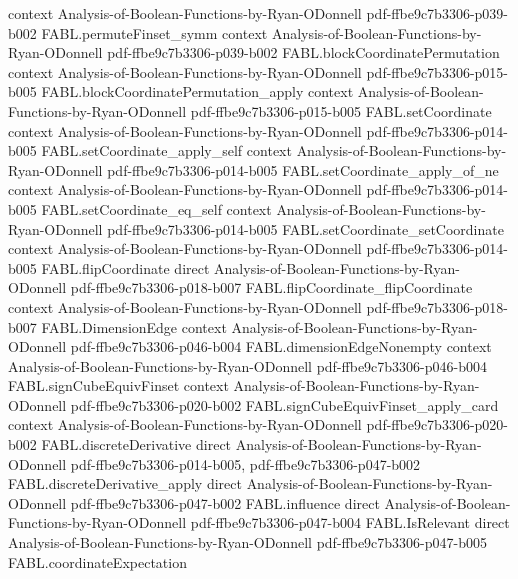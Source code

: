 \begin{theorem}
  {context}
  {Analysis-of-Boolean-Functions-by-Ryan-ODonnell}
  {pdf-ffbe9c7b3306-p039-b002}
\proofstep
  {FABL.permuteFinset_symm}
  {context}
  {Analysis-of-Boolean-Functions-by-Ryan-ODonnell}
  {pdf-ffbe9c7b3306-p039-b002}
\proofstep
  {FABL.blockCoordinatePermutation}
  {context}
  {Analysis-of-Boolean-Functions-by-Ryan-ODonnell}
  {pdf-ffbe9c7b3306-p015-b005}
\proofstep
  {FABL.blockCoordinatePermutation_apply}
  {context}
  {Analysis-of-Boolean-Functions-by-Ryan-ODonnell}
  {pdf-ffbe9c7b3306-p015-b005}
\proofstep
  {FABL.setCoordinate}
  {context}
  {Analysis-of-Boolean-Functions-by-Ryan-ODonnell}
  {pdf-ffbe9c7b3306-p014-b005}
\proofstep
  {FABL.setCoordinate_apply_self}
  {context}
  {Analysis-of-Boolean-Functions-by-Ryan-ODonnell}
  {pdf-ffbe9c7b3306-p014-b005}
\proofstep
  {FABL.setCoordinate_apply_of_ne}
  {context}
  {Analysis-of-Boolean-Functions-by-Ryan-ODonnell}
  {pdf-ffbe9c7b3306-p014-b005}
\proofstep
  {FABL.setCoordinate_eq_self}
  {context}
  {Analysis-of-Boolean-Functions-by-Ryan-ODonnell}
  {pdf-ffbe9c7b3306-p014-b005}
\proofstep
  {FABL.setCoordinate_setCoordinate}
  {context}
  {Analysis-of-Boolean-Functions-by-Ryan-ODonnell}
  {pdf-ffbe9c7b3306-p014-b005}
\proofstep
  {FABL.flipCoordinate}
  {direct}
  {Analysis-of-Boolean-Functions-by-Ryan-ODonnell}
  {pdf-ffbe9c7b3306-p018-b007}
\proofstep
  {FABL.flipCoordinate_flipCoordinate}
  {context}
  {Analysis-of-Boolean-Functions-by-Ryan-ODonnell}
  {pdf-ffbe9c7b3306-p018-b007}
\proofstep
  {FABL.DimensionEdge}
  {context}
  {Analysis-of-Boolean-Functions-by-Ryan-ODonnell}
  {pdf-ffbe9c7b3306-p046-b004}
\proofstep
  {FABL.dimensionEdgeNonempty}
  {context}
  {Analysis-of-Boolean-Functions-by-Ryan-ODonnell}
  {pdf-ffbe9c7b3306-p046-b004}
\proofstep
  {FABL.signCubeEquivFinset}
  {context}
  {Analysis-of-Boolean-Functions-by-Ryan-ODonnell}
  {pdf-ffbe9c7b3306-p020-b002}
\proofstep
  {FABL.signCubeEquivFinset_apply_card}
  {context}
  {Analysis-of-Boolean-Functions-by-Ryan-ODonnell}
  {pdf-ffbe9c7b3306-p020-b002}
\proofstep
  {FABL.discreteDerivative}
  {direct}
  {Analysis-of-Boolean-Functions-by-Ryan-ODonnell}
  {pdf-ffbe9c7b3306-p014-b005,
    pdf-ffbe9c7b3306-p047-b002}
\proofstep
  {FABL.discreteDerivative_apply}
  {direct}
  {Analysis-of-Boolean-Functions-by-Ryan-ODonnell}
  {pdf-ffbe9c7b3306-p047-b002}
\proofstep
  {FABL.influence}
  {direct}
  {Analysis-of-Boolean-Functions-by-Ryan-ODonnell}
  {pdf-ffbe9c7b3306-p047-b004}
\proofstep
  {FABL.IsRelevant}
  {direct}
  {Analysis-of-Boolean-Functions-by-Ryan-ODonnell}
  {pdf-ffbe9c7b3306-p047-b005}
\proofstep
  {FABL.coordinateExpectation}

\end{theorem}
